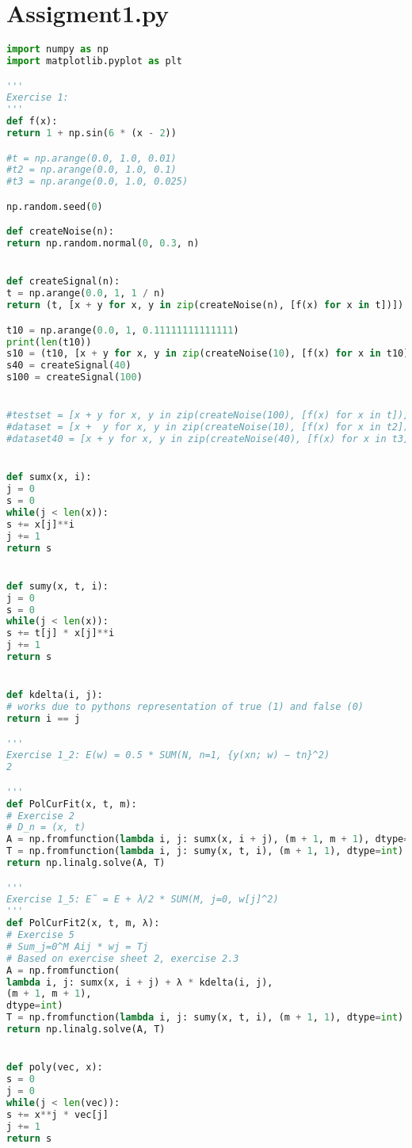 \documentclass{article}
\begin{document}
\section{Assigment1.py}
\begin{lstlisting}[language=python]
import numpy as np
import matplotlib.pyplot as plt

'''
Exercise 1: 
'''
def f(x):
return 1 + np.sin(6 * (x - 2))

#t = np.arange(0.0, 1.0, 0.01)
#t2 = np.arange(0.0, 1.0, 0.1)
#t3 = np.arange(0.0, 1.0, 0.025)

np.random.seed(0)

def createNoise(n):
return np.random.normal(0, 0.3, n)


def createSignal(n):
t = np.arange(0.0, 1, 1 / n)
return (t, [x + y for x, y in zip(createNoise(n), [f(x) for x in t])])

t10 = np.arange(0.0, 1, 0.11111111111111)
print(len(t10))
s10 = (t10, [x + y for x, y in zip(createNoise(10), [f(x) for x in t10])])
s40 = createSignal(40)
s100 = createSignal(100)


#testset = [x + y for x, y in zip(createNoise(100), [f(x) for x in t])]
#dataset = [x +  y for x, y in zip(createNoise(10), [f(x) for x in t2])]
#dataset40 = [x + y for x, y in zip(createNoise(40), [f(x) for x in t3])]


def sumx(x, i):
j = 0
s = 0
while(j < len(x)):
s += x[j]**i
j += 1
return s


def sumy(x, t, i):
j = 0
s = 0
while(j < len(x)):
s += t[j] * x[j]**i
j += 1
return s


def kdelta(i, j):
# works due to pythons representation of true (1) and false (0)
return i == j

'''
Exercise 1_2: E(w) = 0.5 * SUM(N, n=1, {y(xn; w) − tn}^2)
2

'''
def PolCurFit(x, t, m):
# Exercise 2
# D_n = (x, t)
A = np.fromfunction(lambda i, j: sumx(x, i + j), (m + 1, m + 1), dtype=int)
T = np.fromfunction(lambda i, j: sumy(x, t, i), (m + 1, 1), dtype=int)
return np.linalg.solve(A, T)

'''
Exercise 1_5: E˜ = E + λ/2 * SUM(M, j=0, w[j]^2)
'''
def PolCurFit2(x, t, m, λ):
# Exercise 5
# Sum_j=0^M Aij * wj = Tj
# Based on exercise sheet 2, exercise 2.3
A = np.fromfunction(
lambda i, j: sumx(x, i + j) + λ * kdelta(i, j),
(m + 1, m + 1),
dtype=int)
T = np.fromfunction(lambda i, j: sumy(x, t, i), (m + 1, 1), dtype=int)
return np.linalg.solve(A, T)


def poly(vec, x):
s = 0
j = 0
while(j < len(vec)):
s += x**j * vec[j]
j += 1
return s


\end{lstlisting}
\end{document}

